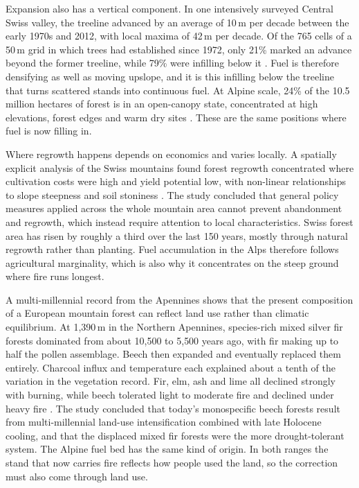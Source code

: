 \documentclass[11pt,a4paper]{article}
\begin{document}
Expansion also has a vertical component. In one intensively surveyed Central Swiss valley, the treeline advanced by an average of 10\,m per decade between the early 1970s and 2012, with local maxima of 42\,m per decade. Of the 765 cells of a 50\,m grid in which trees had established since 1972, only 21\% marked an advance beyond the former treeline, while 79\% were infilling below it \citep{frei_evidence_2023}. Fuel is therefore densifying as well as moving upslope, and it is this infilling below the treeline that turns scattered stands into continuous fuel. At Alpine scale, 24\% of the 10.5 million hectares of forest is in an open-canopy state, concentrated at high elevations, forest edges and warm dry sites \citep{stritih_alternative_2023}. These are the same positions where fuel is now filling in.

Where regrowth happens depends on economics and varies locally. A spatially explicit analysis of the Swiss mountains found forest regrowth concentrated where cultivation costs were high and yield potential low, with non-linear relationships to slope steepness and soil stoniness \citep{gellrich_agricultural_2007}. The study concluded that general policy measures applied across the whole mountain area cannot prevent abandonment and regrowth, which instead require attention to local characteristics. Swiss forest area has risen by roughly a third over the last 150 years, mostly through natural regrowth rather than planting. Fuel accumulation in the Alps therefore follows agricultural marginality, which is also why it concentrates on the steep ground where fire runs longest.

A multi-millennial record from the Apennines shows that the present composition of a European mountain forest can reflect land use rather than climatic equilibrium. At 1{,}390\,m in the Northern Apennines, species-rich mixed silver fir forests dominated from about 10{,}500 to 5{,}500 years ago, with fir making up to half the pollen assemblage. Beech then expanded and eventually replaced them entirely. Charcoal influx and temperature each explained about a tenth of the variation in the vegetation record. Fir, elm, ash and lime all declined strongly with burning, while beech tolerated light to moderate fire and declined under heavy fire \citep{moralesmolino_longterm_2021}. The study concluded that today's monospecific beech forests result from multi-millennial land-use intensification combined with late Holocene cooling, and that the displaced mixed fir forests were the more drought-tolerant system. The Alpine fuel bed has the same kind of origin. In both ranges the stand that now carries fire reflects how people used the land, so the correction must also come through land use.
\end{document}
